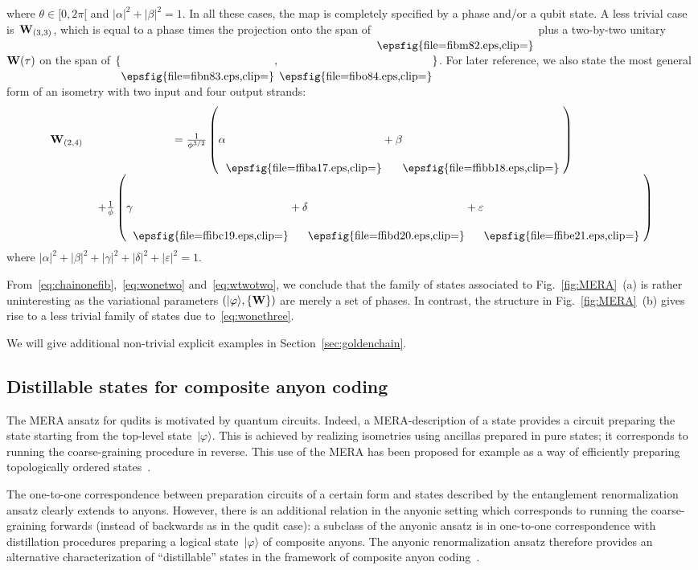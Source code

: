 \documentclass[floats,prb,twocolumn]{revtex4}
\newcommand*{\textfrac}[2]{{{#1}/{#2}}}
\newcommand{\ket}[1]{|#1\rangle}
\newcommand*{\Xisometry}{{\bf W}}
\newcommand*{\ffiba}{\raisebox{-25.383pt}{\epsfig{file=ffiba17.eps,clip=}}}
\newcommand*{\ffibb}{\raisebox{-25.383pt}{\epsfig{file=ffibb18.eps,clip=}}}
\newcommand*{\ffibc}{\raisebox{-25.383pt}{\epsfig{file=ffibc19.eps,clip=}}}
\newcommand*{\ffibd}{\raisebox{-25.383pt}{\epsfig{file=ffibd20.eps,clip=}}}
\newcommand*{\ffibe}{\raisebox{-25.383pt}{\epsfig{file=ffibe21.eps,clip=}}}
\newcommand*{\fibm}{\raisebox{-14.043pt}{\epsfig{file=fibm82.eps,clip=}}}
\newcommand*{\fibn}{\raisebox{-14.043pt}{\epsfig{file=fibn83.eps,clip=}}}
\newcommand*{\fibo}{\raisebox{-14.043pt}{\epsfig{file=fibo84.eps,clip=}}}
\begin{document}
where $\theta\in [0,2\pi[$ and $|\alpha|^2+|\beta|^2=1$. In all these cases, the map is completely specified by a phase and/or a qubit state. A less trivial case is~$\Xisometry_{(3,3)}$, which is equal to a phase times the projection onto the span of~$\fibm$ plus a two-by-two unitary~$\Xisometry(\tau)$ on the span of $\{\fibn,\fibo\}$.  
For later reference, we also state the most general form of an isometry with two input and four output strands:
\begin{align}
\begin{matrix}
\Xisometry_{(2,4)}&=\frac{1}{\phi^{\textfrac{3}{2}}}\left(\alpha\ffiba+\beta\ffibb\ \right)\\
&\ +\frac{1}{\phi}\left(\gamma \ffibc+\delta\ffibd+\varepsilon\ffibe\ \right)
\end{matrix}\label{eq:generaltwofour}
\end{align}
where $|\alpha|^2+|\beta|^2+|\gamma|^2+|\delta|^2+|\varepsilon|^2=1$. 

 
From~\eqref{eq:chainonefib},~\eqref{eq:wonetwo} and~\eqref{eq:wtwotwo}, we conclude that the family of states associated to Fig.~\ref{fig:MERA}~(a) is rather uninteresting as the variational parameters $(\ket{\varphi},\{\Xisometry\})$ are merely a set of phases. In contrast, the structure in Fig.~\ref{fig:MERA}~(b) gives rise to a less trivial family of states due to~\eqref{eq:wonethree}. 

We will give additional  non-trivial explicit examples in Section~\ref{sec:goldenchain}.

\subsection{Distillable states for composite anyon coding}
The MERA ansatz for qudits is motivated by quantum circuits. Indeed, a MERA-description of a state provides a circuit preparing the state starting from  the top-level state~$\ket{\varphi}$. This is achieved by realizing isometries using ancillas prepared in pure states; it corresponds to running the coarse-graining procedure in reverse. This use of the MERA has been proposed for example as a way of efficiently preparing topologically ordered states~\cite{AguadoVidal08}. 

The one-to-one correspondence between preparation circuits of a certain form and states described by the entanglement renormalization ansatz clearly extends to anyons. However, there is an additional relation in the anyonic setting which corresponds to running the coarse-graining forwards (instead of backwards as in the qudit case): a subclass of the anyonic ansatz is in one-to-one correspondence with  distillation procedures preparing a logical state~$\ket{\varphi}$ of composite anyons.  The anyonic renormalization ansatz therefore provides an alternative characterization of ``distillable'' states in the framework of composite anyon coding~\cite{Koe09}.
\end{document}
